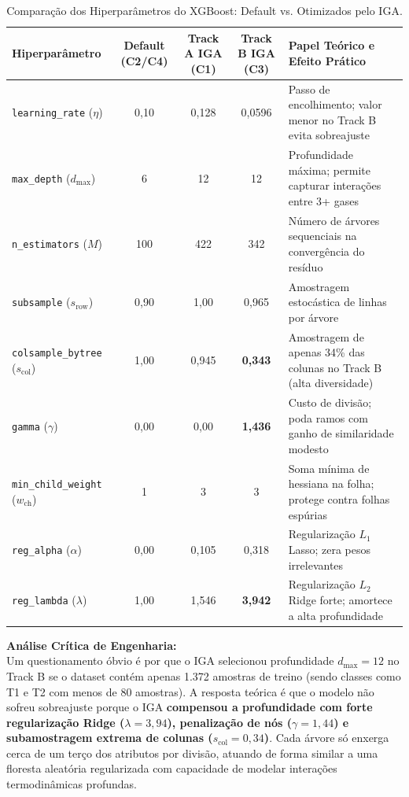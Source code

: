\documentclass[11pt,a4paper]{article}
\begin{document}
\begin{table}[htbp]
  \centering\small
  \caption{Comparação dos Hiperparâmetros do XGBoost: Default vs. Otimizados pelo IGA.}
  \label{tab:xgb_hparams_comparados}
  \begin{tabularx}{\textwidth}{l c c c X}
    \toprule
    \textbf{Hiperparâmetro} & \textbf{Default (C2/C4)} & \textbf{Track A IGA (C1)} & \textbf{Track B IGA (C3)} & \textbf{Papel Teórico e Efeito Prático} \\
    \midrule
    \texttt{learning\_rate} ($\eta$) & 0,10 & 0,128 & 0,0596 & Passo de encolhimento; valor menor no Track B evita sobreajuste \\
    \texttt{max\_depth} ($d_{\max}$) & 6 & 12 & 12 & Profundidade máxima; permite capturar interações entre 3+ gases \\
    \texttt{n\_estimators} ($M$) & 100 & 422 & 342 & Número de árvores sequenciais na convergência do resíduo \\
    \texttt{subsample} ($s_{\text{row}}$) & 0,90 & 1,00 & 0,965 & Amostragem estocástica de linhas por árvore \\
    \texttt{colsample\_bytree} ($s_{\text{col}}$) & 1,00 & 0,945 & \textbf{0,343} & Amostragem de apenas 34\% das colunas no Track B (alta diversidade) \\
    \texttt{gamma} ($\gamma$) & 0,00 & 0,00 & \textbf{1,436} & Custo de divisão; poda ramos com ganho de similaridade modesto \\
    \texttt{min\_child\_weight} ($w_{\text{ch}}$) & 1 & 3 & 3 & Soma mínima de hessiana na folha; protege contra folhas espúrias \\
    \texttt{reg\_alpha} ($\alpha$) & 0,00 & 0,105 & 0,318 & Regularização $L_1$ Lasso; zera pesos irrelevantes \\
    \texttt{reg\_lambda} ($\lambda$) & 1,00 & 1,546 & \textbf{3,942} & Regularização $L_2$ Ridge forte; amortece a alta profundidade \\
    \bottomrule
  \end{tabularx}
\end{table}

\textbf{Análise Crítica de Engenharia:}\\
Um questionamento óbvio é por que o IGA selecionou profundidade $d_{\max} = 12$ no Track B se o dataset contém apenas 1.372 amostras de treino (sendo classes como T1 e T2 com menos de 80 amostras). A resposta teórica é que o modelo não sofreu sobreajuste porque o IGA \textbf{compensou a profundidade com forte regularização Ridge ($\lambda = 3{,}94$), penalização de nós ($\gamma = 1{,}44$) e subamostragem extrema de colunas ($s_{\text{col}} = 0{,}34$)}. Cada árvore só enxerga cerca de um terço dos atributos por divisão, atuando de forma similar a uma floresta aleatória regularizada com capacidade de modelar interações termodinâmicas profundas.
\end{document}

